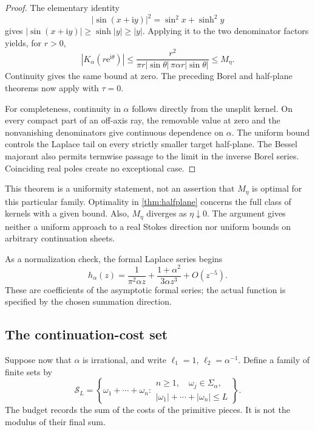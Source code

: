 \documentclass[11pt,a4paper]{article}
\numberwithin{equation}{section}
\theoremstyle{definition}
\theoremstyle{remark}
\newcommand{\ii}{\mathrm i}
\newcommand{\e}{\mathrm e}
\newcommand{\sincost}{\mathcal S}
\begin{document}
\begin{proof}
The elementary identity
\[
 |\sin(x+\ii y)|^2=\sin^2x+\sinh^2y
\]
gives $|\sin(x+\ii y)|\ge\sinh|y|\ge|y|$.
Applying it to the two denominator factors yields, for $r>0$,
\[
 |K_\alpha(r\e^{\ii\theta})|
 \le \frac{r^2}
 {\pi r|\sin\theta|\,\pi\alpha r|\sin\theta|}
 \le M_\eta.
\]
Continuity gives the same bound at zero. The preceding Borel and
half-plane theorems now apply with $\tau=0$.

For completeness, continuity in $\alpha$ follows directly from the
unsplit kernel. On every compact part of an off-axis ray, the removable
value at zero and the nonvanishing denominators give continuous
dependence on $\alpha$. The uniform bound controls the Laplace tail
on every strictly smaller target half-plane. The Bessel majorant
also permits termwise passage to the limit in the inverse Borel
series. Coinciding real poles create no exceptional case.
\end{proof}

This theorem is a uniformity statement, not an assertion that $M_\eta$
is optimal for this particular family. Optimality in \cref{thm:halfplane}
concerns the full class of kernels with a given bound.
Also, $M_\eta$ diverges as $\eta\downarrow0$.
The argument gives neither a uniform approach to a real Stokes direction
nor uniform bounds on arbitrary continuation sheets.

As a normalization check, the formal Laplace series begins
\[
 h_\alpha(z)=\frac1{\pi^2\alpha z}
       +\frac{1+\alpha^2}{3\alpha z^3}+O(z^{-5}).
\]
These are coefficients of the asymptotic formal series; the actual
function is specified by the chosen summation direction.

\subsection{The continuation-cost set}

Suppose now that $\alpha$ is irrational, and write
$\ell_1=1$, $\ell_2=\alpha^{-1}$.
Define a family of finite sets by
\begin{equation}\label{eq:filtered-sine}
 \sincost_L=
 \left\{\omega_1+\cdots+\omega_n:
 \begin{array}{l}
 n\ge1,\quad \omega_j\in\Sigma_\alpha,\\
 |\omega_1|+\cdots+|\omega_n|\le L
 \end{array}\right\}.
\end{equation}
The budget records the sum of the costs of the primitive pieces.
It is not the modulus of their final sum.
\end{document}
